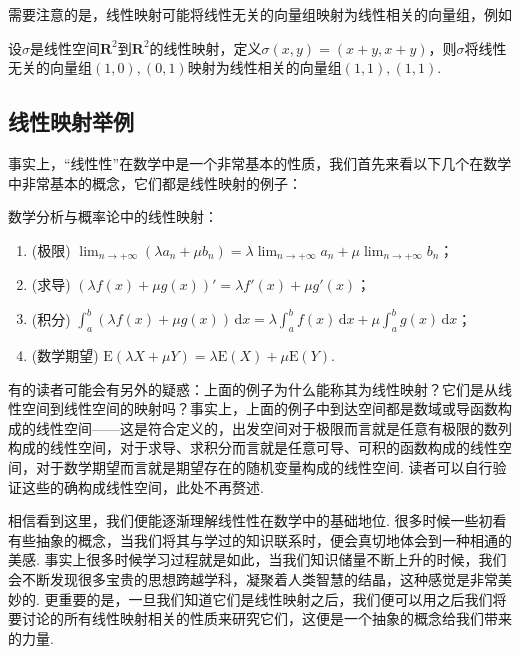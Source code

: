 需要注意的是，线性映射可能将线性无关的向量组映射为线性相关的向量组，例如
\begin{example}{}{}
    设$\sigma$是线性空间$\mathbf{R}^2$到$\mathbf{R}^2$的线性映射，定义$\sigma(x,y)=(x+y,x+y)$，则$\sigma$将线性无关的向量组$(1,0),(0,1)$映射为线性相关的向量组$(1,1),(1,1)$.
\end{example}

\subsection{线性映射举例}

事实上，``线性性''在数学中是一个非常基本的性质，我们首先来看以下几个在数学中非常基本的概念，它们都是线性映射的例子：
\begin{example}{}{}
    数学分析与概率论中的线性映射：
    \begin{enumerate}
        \item (极限) $\displaystyle\lim_{n\to +\infty}(\lambda a_n+\mu b_n)=\lambda\lim_{n\to +\infty}a_n+\mu\displaystyle\lim_{n\to +\infty}b_n$；

        \item (求导) $(\lambda f(x)+\mu g(x))'=\lambda f'(x)+\mu g'(x)$；

        \item (积分) $\displaystyle\int_a^b(\lambda f(x)+\mu g(x))\,\mathrm{d}x=\lambda\int_a^bf(x)\,\mathrm{d}x+\mu\displaystyle\int_a^bg(x)\,\mathrm{d}x$；

        \item (数学期望) $\mathrm{E}(\lambda X+\mu Y)=\lambda \mathrm{E}(X)+\mu \mathrm{E}(Y)$.
    \end{enumerate}
\end{example}

有的读者可能会有另外的疑惑：上面的例子为什么能称其为线性映射？它们是从线性空间到线性空间的映射吗？事实上，上面的例子中到达空间都是数域或导函数构成的线性空间——这是符合定义的，出发空间对于极限而言就是任意有极限的数列构成的线性空间，对于求导、求积分而言就是任意可导、可积的函数构成的线性空间，对于数学期望而言就是期望存在的随机变量构成的线性空间. 读者可以自行验证这些的确构成线性空间，此处不再赘述.

相信看到这里，我们便能逐渐理解线性性在数学中的基础地位. 很多时候一些初看有些抽象的概念，当我们将其与学过的知识联系时，便会真切地体会到一种相通的美感. 事实上很多时候学习过程就是如此，当我们知识储量不断上升的时候，我们会不断发现很多宝贵的思想跨越学科，凝聚着人类智慧的结晶，这种感觉是非常美妙的. 更重要的是，一旦我们知道它们是线性映射之后，我们便可以用之后我们将要讨论的所有线性映射相关的性质来研究它们，这便是一个抽象的概念给我们带来的力量.


